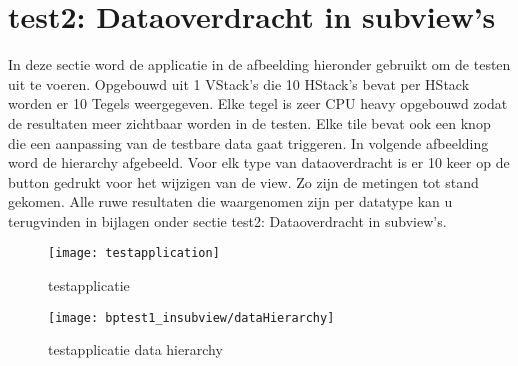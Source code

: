 \section{test2: Dataoverdracht in subview's}
In deze sectie word de applicatie in de afbeelding hieronder gebruikt om de testen uit te voeren. Opgebouwd uit 1 VStack's die 10 HStack's bevat per HStack worden er 10 Tegels weergegeven. Elke tegel is zeer CPU heavy opgebouwd zodat de resultaten meer zichtbaar worden in de testen. Elke tile bevat ook een knop die een aanpassing van de testbare data gaat triggeren. In volgende afbeelding word de hierarchy afgebeeld. Voor elk type van dataoverdracht is er 10 keer op de button gedrukt voor het wijzigen van de view. Zo zijn de metingen tot stand gekomen. Alle ruwe resultaten die waargenomen zijn per datatype kan u terugvinden in bijlagen onder sectie test2: Dataoverdracht in subview's. 
\begin{figure}[H]
    \centering
    \texttt{[image: testapplication]} 
    \caption{testapplicatie}
    \label{fig:testapplication}
\end{figure}
\begin{figure}[H]
    \centering
    \texttt{[image: bptest1\_insubview/dataHierarchy]} 
    \caption{testapplicatie data hierarchy}
    \label{fig:testapplicationHierarchy}
\end{figure}

